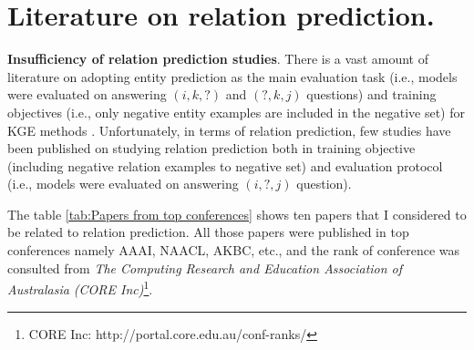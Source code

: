 \section{Literature on relation prediction.}
\noindent\textbf{Insufficiency of relation prediction studies}. There is a vast amount of literature on adopting entity prediction as the main evaluation task (i.e., models were evaluated on answering $(i,k,?)$ and $(?,k,j)$ questions) and training objectives (i.e., only negative entity examples are included in the negative set) for KGE methods \citep{bordes2013translating, lin2015learning, nickel2016holographic, wang2014knowledge}. Unfortunately, in terms of relation prediction, few studies have been published on studying relation prediction both in training objective (including negative relation examples to negative set) and evaluation protocol (i.e., models were evaluated on answering $(i,?,j)$ question). 

The table \ref{tab:Papers from top conferences} shows ten papers that I considered to be related to relation prediction. All those papers were published in top conferences namely AAAI, NAACL, AKBC, etc., and the rank of conference was consulted from \textit{The Computing Research and Education Association of Australasia (CORE Inc)}\footnote{CORE Inc: http://portal.core.edu.au/conf-ranks/}.

